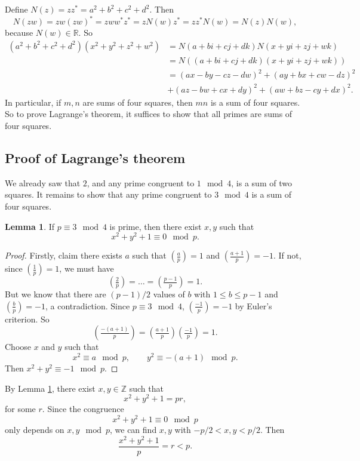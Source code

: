 \documentclass{article}
\newcommand{\Z}{\mathbb{Z}}
\newcommand{\R}{\mathbb{R}}
\newcommand{\rb}[1]{\left( #1 \right)}
\newcommand{\legendre}[2]{\rb{\tfrac{#1}{#2}}}
\theoremstyle{definition}\newtheorem{definition}{Definition}
\theoremstyle{definition}\newtheorem{remark}[definition]{Remark}
\theoremstyle{definition}\newtheorem*{example}{Example}
\theoremstyle{definition}\newtheorem*{note}{Note}
\newtheorem{lemma}[definition]{Lemma}
\begin{document}
Define $ N\rb{z} = zz^* = a^2 + b^2 + c^2 + d^2 $. Then
$$ N\rb{zw} = zw\rb{zw}^* = zww^*z^* = zN\rb{w}z^* = zz^*N\rb{w} = N\rb{z}N\rb{w}, $$
because $ N\rb{w} \in \R $. So
\begin{align*}
\rb{a^2 + b^2 + c^2 + d^2}\rb{x^2 + y^2 + z^2 + w^2}
& = N\rb{a + bi + cj + dk}N\rb{x + yi + zj + wk} \\
& = N\rb{\rb{a + bi + cj + dk}\rb{x + yi + zj + wk}} \\
& = \rb{ax - by - cz - dw}^2 + \rb{ay + bx + cw - dz}^2 \\
& + \rb{az - bw + cx + dy}^2 + \rb{aw + bz - cy + dx}^2.
\end{align*}
In particular, if $ m, n $ are sums of four squares, then $ mn $ is a sum of four squares. So to prove Lagrange's theorem, it suffices to show that all primes are sums of four squares.

\subsection{Proof of Lagrange's theorem}

We already saw that $ 2 $, and any prime congruent to $ 1 \mod 4 $, is a sum of two squares. It remains to show that any prime congruent to $ 3 \mod 4 $ is a sum of four squares.


\begin{lemma}
\label{lem:54}
If $ p \equiv 3 \mod 4 $ is prime, then there exist $ x, y $ such that
$$ x^2 + y^2 + 1 \equiv 0 \mod p. $$
\end{lemma}

\begin{proof}
Firstly, claim there exists $ a $ such that $ \legendre{a}{p} = 1 $ and $ \legendre{a + 1}{p} = -1 $. If not, since $ \legendre{1}{p} = 1 $, we must have
$$ \legendre{2}{p} = \dots = \legendre{p - 1}{p} = 1. $$
But we know that there are $ \rb{p - 1} / 2 $ values of $ b $ with $ 1 \le b \le p - 1 $ and $ \legendre{b}{p} = -1 $, a contradiction. Since $ p \equiv 3 \mod 4 $, $ \legendre{-1}{p} = -1 $ by Euler's criterion. So
$$ \legendre{-\rb{a + 1}}{p} = \legendre{a + 1}{p}\legendre{-1}{p} = 1. $$
Choose $ x $ and $ y $ such that
$$ x^2 \equiv a \mod p, \qquad y^2 \equiv -\rb{a + 1} \mod p. $$
Then $ x^2 + y^2 \equiv -1 \mod p $.
\end{proof}

By Lemma \ref{lem:54}, there exist $ x, y \in \Z $ such that
$$ x^2 + y^2 + 1 = pr, $$
for some $ r $. Since the congruence
$$ x^2 + y^2 + 1 \equiv 0 \mod p $$
only depends on $ x, y \mod p $, we can find $ x, y $ with $ -p / 2 < x, y < p / 2 $. Then
$$ \dfrac{x^2 + y^2 + 1}{p} = r < p. $$
\end{document}
